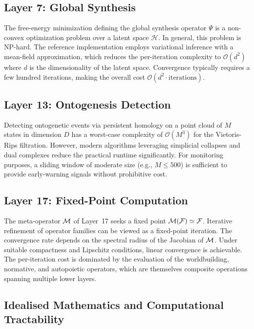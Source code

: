 \subsection{Layer 7: Global Synthesis}

The free-energy minimization defining the global synthesis operator $\Psi$ is a non-convex optimization problem over a latent space $\mathcal{H}$. In general, this problem is NP-hard. The reference implementation employs variational inference with a mean-field approximation, which reduces the per-iteration complexity to $\mathcal{O}(d^2)$ where $d$ is the dimensionality of the latent space. Convergence typically requires a few hundred iterations, making the overall cost $\mathcal{O}(d^2 \cdot \text{iterations})$.

\subsection{Layer 13: Ontogenesis Detection}

Detecting ontogenetic events via persistent homology on a point cloud of $M$ states in dimension $D$ has a worst-case complexity of $\mathcal{O}(M^3)$ for the Vietoris-Rips filtration. However, modern algorithms leveraging simplicial collapses and dual complexes reduce the practical runtime significantly. For monitoring purposes, a sliding window of moderate size (e.g., $M \le 500$) is sufficient to provide early-warning signals without prohibitive cost.

\subsection{Layer 17: Fixed-Point Computation}

The meta-operator $\mathcal{M}$ of Layer~17 seeks a fixed point $\mathcal{M}(\mathcal{F}) \simeq \mathcal{F}$. Iterative refinement of operator families can be viewed as a fixed-point iteration. The convergence rate depends on the spectral radius of the Jacobian of $\mathcal{M}$. Under suitable compactness and Lipschitz conditions, linear convergence is achievable. The per-iteration cost is dominated by the evaluation of the worldbuilding, normative, and autopoietic operators, which are themselves composite operations spanning multiple lower layers.

\subsection{Idealised Mathematics and Computational Tractability}
\label{subsec:ideal_vs_real}

